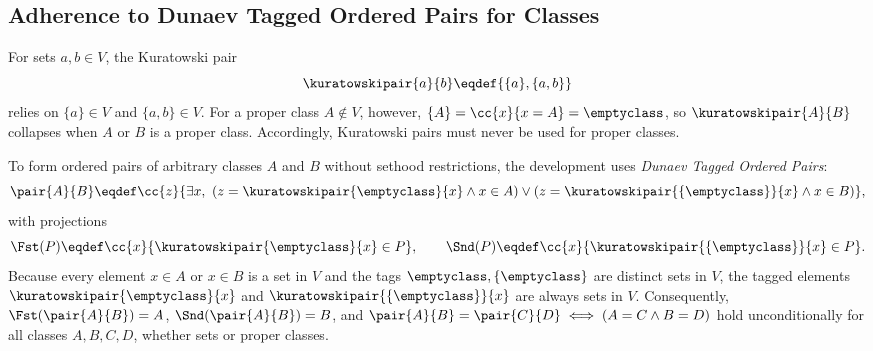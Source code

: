\subsection{Adherence to Dunaev Tagged Ordered Pairs for Classes}

For sets $a, b \in V$, the Kuratowski pair
\[
\kuratowskipair{a}{b} \eqdef \{\{a\}, \{a, b\}\}
\]
relies on $\{a\} \in V$ and $\{a, b\} \in V$. For a proper class $A \notin V$,
however, $\{A\} = \cc{x}{x = A} = \emptyclass$, so $\kuratowskipair{A}{B}$
collapses when $A$ or $B$ is a proper class. Accordingly, Kuratowski pairs must
never be used for proper classes.

To form ordered pairs of arbitrary classes $A$ and $B$ without sethood
restrictions, the development uses \emph{Dunaev Tagged Ordered Pairs}:
\[
\pair{A}{B} \eqdef \cc{z}{\exists x,\ (z = \kuratowskipair{\emptyclass}{x} \land x \in A) \lor (z = \kuratowskipair{\{\emptyclass\}}{x} \land x \in B)},
\]
with projections
\[
\Fst(P) \eqdef \cc{x}{\kuratowskipair{\emptyclass}{x} \in P},
\qquad
\Snd(P) \eqdef \cc{x}{\kuratowskipair{\{\emptyclass\}}{x} \in P}.
\]
Because every element $x \in A$ or $x \in B$ is a set in $V$ and the tags
$\emptyclass, \{\emptyclass\}$ are distinct sets in $V$, the tagged elements
$\kuratowskipair{\emptyclass}{x}$ and $\kuratowskipair{\{\emptyclass\}}{x}$ are
always sets in $V$. Consequently, $\Fst(\pair{A}{B}) = A$, $\Snd(\pair{A}{B}) = B$,
and $\pair{A}{B} = \pair{C}{D} \iff (A = C \land B = D)$ hold unconditionally for
all classes $A, B, C, D$, whether sets or proper classes.

